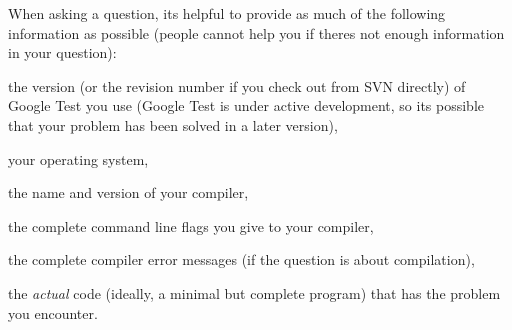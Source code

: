 When asking a question, it\textquotesingle{}s helpful to provide as much of the following information as possible (people cannot help you if there\textquotesingle{}s not enough information in your question)\+:


\begin{DoxyItemize}
\item the version (or the revision number if you check out from S\+VN directly) of Google Test you use (Google Test is under active development, so it\textquotesingle{}s possible that your problem has been solved in a later version),
\item your operating system,
\item the name and version of your compiler,
\item the complete command line flags you give to your compiler,
\item the complete compiler error messages (if the question is about compilation),
\item the {\itshape actual} code (ideally, a minimal but complete program) that has the problem you encounter.\+ 
\end{DoxyItemize}